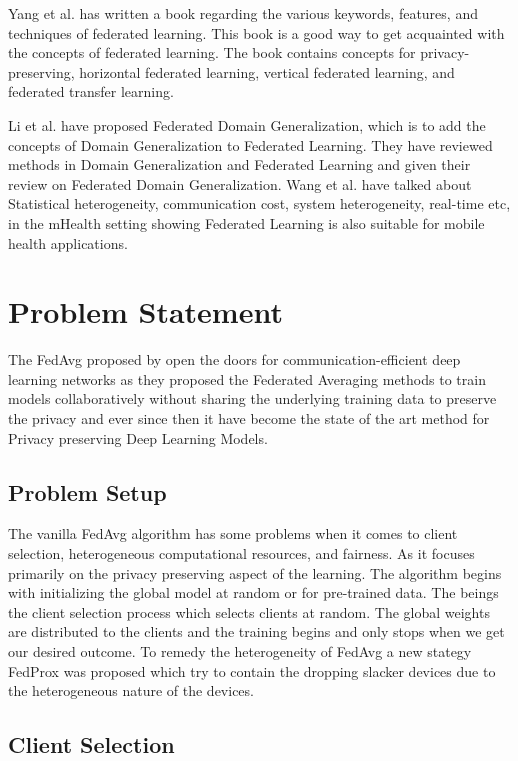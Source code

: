 \documentclass[conference]{IEEEtran}
\begin{document}
\par Yang et al. \cite{yang2019federated} has written a book regarding the various keywords, features, and techniques of federated learning. This book is a good way to get acquainted with the concepts of federated learning. The book contains concepts for privacy-preserving, horizontal federated learning, vertical federated learning, and federated transfer learning. \par
Li et al. \cite{li2023federated} have proposed Federated Domain Generalization, which is to add the concepts of Domain Generalization to Federated Learning. They have reviewed methods in Domain Generalization and Federated Learning and given their review on Federated Domain Generalization. Wang et al. \cite{wang2023applications} have talked about Statistical heterogeneity, communication cost, system heterogeneity, real-time etc, in the mHealth setting showing Federated Learning is also suitable for mobile health applications.

\section{Problem Statement}
The FedAvg proposed by \cite{mcmahan2017communication} open the doors for communication-efficient deep learning networks as they proposed the Federated Averaging methods to train models collaboratively without sharing the underlying training data to preserve the privacy and ever since then it have become the state of the art method for Privacy preserving Deep Learning Models. 
\subsection{Problem Setup} 
The vanilla FedAvg algorithm has some problems when it comes to client selection, heterogeneous computational resources, and fairness. As it focuses primarily on the privacy preserving aspect of the learning. The algorithm begins with initializing the global model at random or for pre-trained data. The beings the client selection process which selects clients at random. The global weights are distributed to the clients and the training begins and only stops when we get our desired outcome. To remedy the heterogeneity of FedAvg a new stategy FedProx \cite{li2020federated} was proposed which try to contain the dropping slacker devices due to the heterogeneous nature of the devices.

\subsection{Client Selection}
\end{document}
